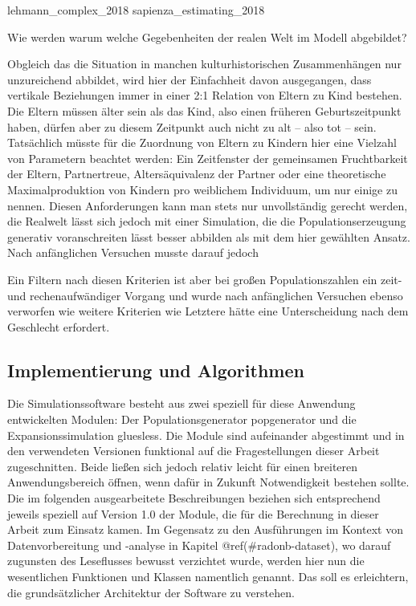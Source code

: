 \documentclass[openany,twoside,twocolumn]{book}
\begin{document}
lehmann\_complex\_2018 sapienza\_estimating\_2018

Wie werden warum welche Gegebenheiten der realen Welt im Modell
abgebildet?

Obgleich das die Situation in manchen kulturhistorischen Zusammenhängen
nur unzureichend abbildet, wird hier der Einfachheit davon ausgegangen,
dass vertikale Beziehungen immer in einer 2:1 Relation von Eltern zu
Kind bestehen. Die Eltern müssen älter sein als das Kind, also einen
früheren Geburtszeitpunkt haben, dürfen aber zu diesem Zeitpunkt auch
nicht zu alt -- also tot -- sein. Tatsächlich müsste für die Zuordnung
von Eltern zu Kindern hier eine Vielzahl von Parametern beachtet werden:
Ein Zeitfenster der gemeinsamen Fruchtbarkeit der Eltern, Partnertreue,
Altersäquivalenz der Partner oder eine theoretische Maximalproduktion
von Kindern pro weiblichem Individuum, um nur einige zu nennen. Diesen
Anforderungen kann man stets nur unvollständig gerecht werden, die
Realwelt lässt sich jedoch mit einer Simulation, die die
Populationserzeugung generativ voranschreiten lässt besser abbilden als
mit dem hier gewählten Ansatz. Nach anfänglichen Versuchen musste darauf
jedoch

Ein Filtern nach diesen Kriterien ist aber bei großen Populationszahlen
ein zeit- und rechenaufwändiger Vorgang und wurde nach anfänglichen
Versuchen ebenso verworfen wie weitere Kriterien wie Letztere hätte eine
Unterscheidung nach dem Geschlecht erfordert.

\hypertarget{implementierung-und-algorithmen}{%
\subsection{Implementierung und
Algorithmen}\label{implementierung-und-algorithmen}}

Die Simulationssoftware besteht aus zwei speziell für diese Anwendung
entwickelten Modulen: Der Populationsgenerator popgenerator und die
Expansionssimulation gluesless. Die Module sind aufeinander abgestimmt
und in den verwendeten Versionen funktional auf die Fragestellungen
dieser Arbeit zugeschnitten. Beide ließen sich jedoch relativ leicht für
einen breiteren Anwendungsbereich öffnen, wenn dafür in Zukunft
Notwendigkeit bestehen sollte. Die im folgenden ausgearbeitete
Beschreibungen beziehen sich entsprechend jeweils speziell auf Version
1.0 der Module, die für die Berechnung in dieser Arbeit zum Einsatz
kamen. Im Gegensatz zu den Ausführungen im Kontext von Datenvorbereitung
und -analyse in Kapitel @ref(\#radonb-dataset), wo darauf zugunsten des
Leseflusses bewusst verzichtet wurde, werden hier nun die wesentlichen
Funktionen und Klassen namentlich genannt. Das soll es erleichtern, die
grundsätzlicher Architektur der Software zu verstehen.
\end{document}
